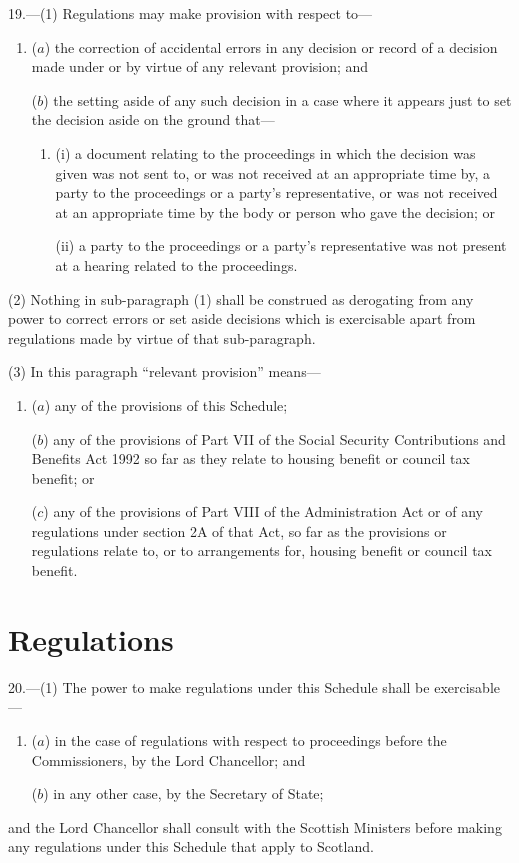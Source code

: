 \documentclass[12pt,a4paper]{article}
\begin{document}
19.---(1) Regulations may make provision with respect to—
\begin{enumerate}\item[]
($a$) the correction of accidental errors in any decision or record of a decision made under or by virtue of any relevant provision; and

($b$) the setting aside of any such decision in a case where it appears just to set the decision aside on the ground that—
\begin{enumerate}\item[]
(i) a document relating to the proceedings in which the decision was given was not sent to, or was not received at an appropriate time by, a party to the proceedings or a party’s representative, or was not received at an appropriate time by the body or person who gave the decision; or

(ii) a party to the proceedings or a party’s representative was not present at a hearing related to the proceedings.
\end{enumerate}
\end{enumerate}

(2) Nothing in sub-paragraph (1)  shall be construed as derogating from any power to correct errors or set aside decisions which is exercisable apart from regulations made by virtue of that sub-paragraph.

(3) In this paragraph “relevant provision” means—
\begin{enumerate}\item[]
($a$) any of the provisions of this Schedule;

($b$) any of the provisions of Part VII of the Social Security Contributions and Benefits Act 1992 so far as they relate to housing benefit or council tax benefit; or

($c$) any of the provisions of Part VIII of the Administration Act or of any regulations under section 2A of that Act, so far as the provisions or regulations relate to, or to arrangements for, housing benefit or council tax benefit.
\end{enumerate}


\section*{Regulations}

20.---(1) The power to make regulations under this Schedule shall be exercisable—
\begin{enumerate}\item[]
($a$) in the case of regulations with respect to proceedings before the Commissioners, by the Lord Chancellor; and

($b$) in any other case, by the Secretary of State;
\end{enumerate}
and the Lord Chancellor shall consult with the Scottish Ministers before making any regulations under this Schedule that apply to Scotland.
\end{document}
